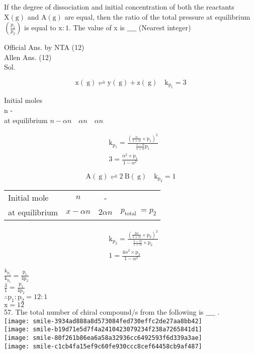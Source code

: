 \documentclass[10pt]{article}
\begin{document}
If the degree of dissociation and initial concentration of both the reactants \(\mathrm{X}(\mathrm{g})\) and \(\mathrm{A}(\mathrm{g})\) are equal, then the ratio of the total pressure at equilibrium \(\left(\frac{p_{1}}{p_{2}}\right)\) is equal to \(\mathrm{x}: 1\). The value of x is \(\_\_\_\_\) (Nearest integer)

Official Ans. by NTA (12)\\
Allen Ans. (12)\\
Sol.

\[
\mathrm{x}(\mathrm{~g}) \rightleftharpoons \mathrm{y}(\mathrm{~g})+\mathrm{z}(\mathrm{~g}) \quad \mathrm{k}_{\mathrm{p}_{1}}=3
\]

Initial moles\\
n -\\
at equilibrium \(n-\alpha n \quad \alpha n \quad \alpha n\)

\[
\begin{aligned}
& \mathrm{k}_{\mathrm{p}_{1}}=\frac{\left(\frac{\alpha}{1+\alpha} \times \mathrm{p}_{1}\right)^{2}}{\frac{1-\alpha}{1+\alpha} \mathrm{p}_{1}} \\
& 3=\frac{\alpha^{2} \times \mathrm{p}_{1}}{1-\alpha^{2}}
\end{aligned}
\]

\[
\mathrm{A}(\mathrm{~g}) \rightleftharpoons 2 \mathrm{~B}(\mathrm{~g}) \quad \mathrm{k}_{\mathrm{p}_{2}}=1
\]

\begin{center}
\begin{tabular}{lccc}
Initial mole & \(n\) & - &  \\
at equilibrium & \(x-\alpha n\) & \(2 \alpha n\) & \(p_{\text {total }}=p_{2}\) \\
\end{tabular}
\end{center}

\[
\begin{aligned}
& \mathrm{k}_{\mathrm{p}_{2}}=\frac{\left(\frac{2 \alpha}{1+\alpha} \times \mathrm{p}_{2}\right)^{2}}{\frac{1-\alpha}{1+\alpha} \times \mathrm{p}_{2}} \\
& 1=\frac{4 \alpha^{2} \times \mathrm{p}_{2}}{1-\alpha^{2}}
\end{aligned}
\]

\(\frac{\mathrm{k}_{\mathrm{p}_{1}}}{\mathrm{k}_{\mathrm{p}_{2}}}=\frac{\mathrm{p}_{1}}{4 \mathrm{p}_{2}}\)\\
\(\frac{3}{1}=\frac{\mathrm{p}_{1}}{4 \mathrm{p}_{2}}\)\\
\(\therefore \mathrm{p}_{1}: \mathrm{p}_{2}=12: 1\)\\
\(\mathrm{x}=12\)\\
57. The total number of chiral compound/s from the following is \(\_\_\_\_\) .\\
\texttt{[image: smile-3934ad888a8d573084fed730effc2de27aa8bb42]}\\
\texttt{[image: smile-b19d71e5d7f4a2410423079234f238a7265841d1]}\\
\texttt{[image: smile-80f261b86ea6a58a32936cc6492593f6d339a3ae]}\\
\texttt{[image: smile-c1cb4fa15ef9c60fe930ccc8cef64458cb9af487]}
\end{document}
